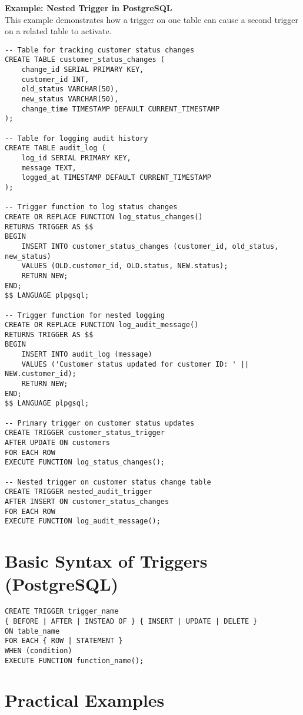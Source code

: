 \documentclass{article}
\begin{document}
\textbf{Example: Nested Trigger in PostgreSQL}\\
This example demonstrates how a trigger on one table can cause a second trigger on a related table to activate.

\begin{verbatim}
-- Table for tracking customer status changes
CREATE TABLE customer_status_changes (
    change_id SERIAL PRIMARY KEY,
    customer_id INT,
    old_status VARCHAR(50),
    new_status VARCHAR(50),
    change_time TIMESTAMP DEFAULT CURRENT_TIMESTAMP
);

-- Table for logging audit history
CREATE TABLE audit_log (
    log_id SERIAL PRIMARY KEY,
    message TEXT,
    logged_at TIMESTAMP DEFAULT CURRENT_TIMESTAMP
);

-- Trigger function to log status changes
CREATE OR REPLACE FUNCTION log_status_changes()
RETURNS TRIGGER AS $$
BEGIN
    INSERT INTO customer_status_changes (customer_id, old_status, new_status)
    VALUES (OLD.customer_id, OLD.status, NEW.status);
    RETURN NEW;
END;
$$ LANGUAGE plpgsql;

-- Trigger function for nested logging
CREATE OR REPLACE FUNCTION log_audit_message()
RETURNS TRIGGER AS $$
BEGIN
    INSERT INTO audit_log (message)
    VALUES ('Customer status updated for customer ID: ' || NEW.customer_id);
    RETURN NEW;
END;
$$ LANGUAGE plpgsql;

-- Primary trigger on customer status updates
CREATE TRIGGER customer_status_trigger
AFTER UPDATE ON customers
FOR EACH ROW
EXECUTE FUNCTION log_status_changes();

-- Nested trigger on customer status change table
CREATE TRIGGER nested_audit_trigger
AFTER INSERT ON customer_status_changes
FOR EACH ROW
EXECUTE FUNCTION log_audit_message();
\end{verbatim}

\section{Basic Syntax of Triggers (PostgreSQL)}
\begin{verbatim}
CREATE TRIGGER trigger_name
{ BEFORE | AFTER | INSTEAD OF } { INSERT | UPDATE | DELETE }
ON table_name
FOR EACH { ROW | STATEMENT }
WHEN (condition)
EXECUTE FUNCTION function_name();
\end{verbatim}

\section{Practical Examples}
\end{document}
